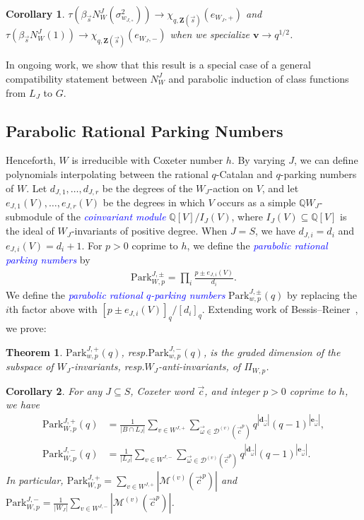 \documentclass[submission]{FPSAC2025}
\newtheorem{thm}{Theorem}
\newtheorem{cor}{Corollary}
\newcommand{\dfemph}[1]{\textcolor{blue}{\emph{#1}}}
\newcommand{\m}{p}
\newcommand{\x}{\mathbf{v}}
\newcommand{\CharQ}[1]{\chi_{q, #1}}
\newcommand{\Park}{\mathrm{Park}}
\newcommand{\ParkSpace}{\Pi}
\begin{document}
\begin{cor}
$\tau(\beta_{\vec{s}} N_W^J(\sigma_{w_{J, \circ}}^2)) \to \CharQ{\mathbf{Z}(\vec{s})}(e_{W_J, +})$ and $\tau(\beta_{\vec{s}} N_W^J(1)) \to \CharQ{\mathbf{Z}(\vec{s})}(e_{W_J, -})$ when we specialize $\x \to q^{1/2}$.
\end{cor}

In ongoing work, we show that this result is a special case of a general compatibility statement between $N_W^J$ and parabolic induction of class functions from $L_J$ to $G$.

\subsection{Parabolic Rational Parking Numbers}

Henceforth, $W$ is irreducible with Coxeter number $h$.
By varying $J$, we can define polynomials interpolating between the rational $q$-Catalan and $q$-parking numbers of $W$.
Let $d_{J,1}, \ldots, d_{J,r}$ be the degrees of the $W_J$-action on $V$, and let $e_{J,1}(V), \ldots, e_{J,r}(V)$ be the degrees in which $V$ occurs as a simple $\mathbb{Q}W_J$-submodule of the \dfemph{coinvariant module} $\mathbb{Q}[V]/I_J(V)$, where $I_J(V) \subseteq \mathbb{Q}[V]$ is the ideal of $W_J$-invariants of positive degree.
When $J = S$, we have $d_{J,i} = d_i$ and $e_{J,i}(V) = d_i + 1$.
For $\m > 0$ coprime to $h$, we define the \dfemph{parabolic rational parking numbers} by
\begin{align}
\Park_{W, \m}^{J, \pm} = \prod_i \frac{\m \pm e_{J, i}(V)}{d_i}.
\end{align}
We define the \dfemph{parabolic rational $q$-parking numbers} $\Park_{w, \m}^{J, \pm}(q)$ by replacing the $i$th factor above with $[\m \pm e_{J, i}(V)]_q/[d_i]_q$.
Extending work of Bessis--Reiner~\cite{br}, we prove:

\begin{thm}\label{thm:parabolic-product}
$\Park_{w, \m}^{J, +}(q)$, \emph{resp.}\@ $\Park_{w, \m}^{J, -}(q)$, is the graded dimension of the subspace of $W_J$-invariants, \emph{resp.}\@ $W_J$-anti-invariants, of $\ParkSpace_{W, \m}$.
\end{thm}

\begin{cor}\label{cor:parabolic}
For any $J \subseteq S$, Coxeter word $\vec{c}$, and integer $\m > 0$ coprime to $h$, we have
\begin{align}\label{eq:enum-q-parking-parabolic}
\Park_{W, \m}^{J, +}(q)
	&=	
	\frac{1}{|B \cap L_J|} 
	\sum_{v \in W^{J, +}} 
	\sum_{\vec{\omega} \in \mathcal{D}^{(v)}(\vec{c}^\m)}
	q^{|\mathbf{d}_{\vec{\omega}}|} (q - 1)^{|\mathbf{e}_{\vec{\omega}}|},\\
\Park_{W, \m}^{J, -}(q)
	&=	
	\frac{1}{|L_J|} 
	\sum_{v \in W^{J, -}} 
	\sum_{\vec{\omega} \in \mathcal{D}^{(v)}(\vec{c}^\m)}
	q^{|\mathbf{d}_{\vec{\omega}}|} (q - 1)^{|\mathbf{e}_{\vec{\omega}}|}.
\end{align}
In particular, $\Park_{W, \m}^{J, +} = \sum_{v \in W^{J, +}} |\mathcal{M}^{(v)}(\vec{c}^\m)|$ and $\Park_{W, \m}^{J, -} = \frac{1}{|W_J|} \sum_{v \in W^{J, -}} |\mathcal{M}^{(v)}(\vec{c}^\m)|$.
\end{cor}
\end{document}
